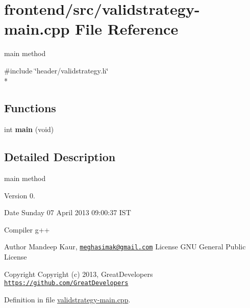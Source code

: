 \hypertarget{validstrategy-main_8cpp}{\section{frontend/src/validstrategy-\/main.cpp File Reference}
\label{validstrategy-main_8cpp}
}


main method  


{\ttfamily \#include \char`\"{}header/validstrategy.\-h\char`\"{}}\\*
\subsection*{Functions}
\begin{DoxyCompactItemize}
\item 
\hypertarget{validstrategy-main_8cpp_a840291bc02cba5474a4cb46a9b9566fe}{int {\bfseries main} (void)}\label{validstrategy-main_8cpp_a840291bc02cba5474a4cb46a9b9566fe}

\end{DoxyCompactItemize}


\subsection{Detailed Description}
main method \begin{DoxyVersion}{Version}
0. 
\end{DoxyVersion}
\begin{DoxyDate}{Date}
Sunday 07 April 2013 09\-:00\-:37 I\-S\-T\par
Compiler g++
\end{DoxyDate}
\begin{DoxyAuthor}{Author}
Mandeep Kaur, \href{mailto:meghasimak@gmail.com}{\tt meghasimak@gmail.\-com} License G\-N\-U General Public License 
\end{DoxyAuthor}
\begin{DoxyCopyright}{Copyright}
Copyright (c) 2013, Great\-Developers \href{https://github.com/GreatDevelopers}{\tt https\-://github.\-com/\-Great\-Developers} 
\end{DoxyCopyright}


Definition in file \hyperlink{validstrategy-main_8cpp_source}{validstrategy-\/main.\-cpp}.

